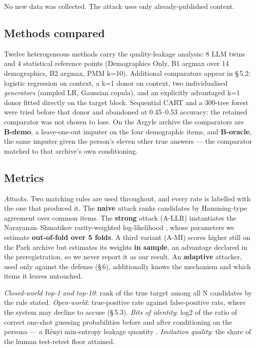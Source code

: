 \documentclass[sigconf,anonymous,review]{acmart}
\begin{document}
No new data was collected. The attack uses only already-published content.

\subsection{Methods compared}

Twelve heterogeneous methods carry the quality-leakage analysis: 8 LLM twins and 4 statistical reference points (Demographics Only, B1 argmax over 14 demographics, B2 argmax, PMM k=10). Additional comparators appear in \S\,5.2: logistic regression on context, a k=1 donor on context, two individualised \textit{generators} (sampled LR, Gaussian copula), and an explicitly advantaged k=1 donor fitted directly on the target block. Sequential CART and a 300-tree forest were tried before that donor and abandoned at 0.45--0.53 accuracy: the retained comparator was not chosen to lose. On the Argyle archive the comparators are \textbf{B-demo}, a leave-one-out imputer on the four demographic items, and \textbf{B-oracle}, the same imputer given the person's eleven other true answers --- the comparator matched to that archive's own conditioning.

\subsection{Metrics}

\textit{Attacks.} Two matching rules are used throughout, and every rate is labelled with the one that produced it. The \textbf{naive} attack ranks candidates by Hamming-type agreement over common items. The \textbf{strong} attack (A-LLR) instantiates the Narayanan--Shmatikov rarity-weighted log-likelihood \cite{narayanan2008robust}, whose parameters we estimate \textbf{out-of-fold over 5 folds}. A third variant (A-MI) scores higher still on the Park archive but estimates its weights \textbf{in sample}, an advantage declared in the preregistration, so we never report it as our result. An \textbf{adaptive} attacker, used only against the defense (\S\,6), additionally knows the mechanism and which items it leaves untouched.

\textit{Closed-world top-1 and top-10}: rank of the true target among all N candidates by the rule stated. \textit{Open-world}: true-positive rate against false-positive rate, where the system may decline to accuse (\S\,5.3). \textit{Bits of identity}: log2 of the ratio of correct one-shot guessing probabilities before and after conditioning on the persona --- a Rényi min-entropy leakage quantity \cite{smith2009foundations}. \textit{Imitation quality}: the share of the human test-retest floor attained.
\end{document}
